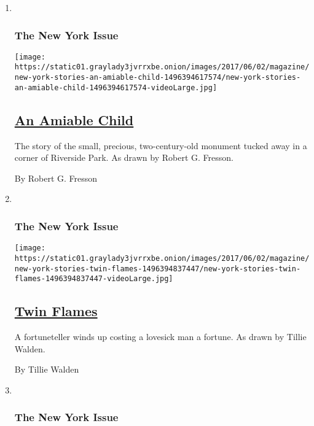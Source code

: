 \begin{enumerate}
\def\labelenumi{\arabic{enumi}.}
\item ~
  \hypertarget{the-new-york-issue-4}{%
  \subsubsection{The New York Issue}\label{the-new-york-issue-4}}

  \texttt{[image: https://static01.graylady3jvrrxbe.onion/images/2017/06/02/magazine/new-york-stories-an-amiable-child-1496394617574/new-york-stories-an-amiable-child-1496394617574-videoLarge.jpg]}

  \hypertarget{an-amiable-child}{%
  \subsection{\texorpdfstring{\href{/interactive/2017/06/02/magazine/new-york-stories-an-amiable-child.html}{An
  Amiable Child}}{An Amiable Child}}\label{an-amiable-child}}

  The story of the small, precious, two-century-old monument tucked away
  in a corner of Riverside Park. As drawn by Robert G. Fresson.

  By Robert G. Fresson
\item ~
  \hypertarget{the-new-york-issue-5}{%
  \subsubsection{The New York Issue}\label{the-new-york-issue-5}}

  \texttt{[image: https://static01.graylady3jvrrxbe.onion/images/2017/06/02/magazine/new-york-stories-twin-flames-1496394837447/new-york-stories-twin-flames-1496394837447-videoLarge.jpg]}

  \hypertarget{twin-flames}{%
  \subsection{\texorpdfstring{\href{/interactive/2017/06/02/magazine/new-york-stories-twin-flames.html}{Twin
  Flames}}{Twin Flames}}\label{twin-flames}}

  A fortuneteller winds up costing a lovesick man a fortune. As drawn by
  Tillie Walden.

  By Tillie Walden
\item ~
  \hypertarget{the-new-york-issue-6}{%
  \subsubsection{The New York Issue}\label{the-new-york-issue-6}}


\end{enumerate}
